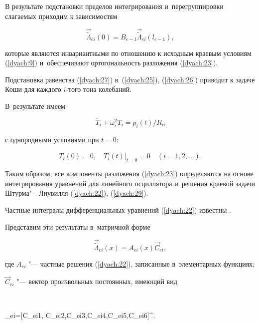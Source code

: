 В результате подстановки пределов интегрирования и~перегруппировки слагаемых приходим к зависимостям

\begin{equation}

\label{dyach:29}

\vec{\widetilde{\Lambda}}_{ei}(0)=B_{e-1}\vec{\widetilde{\Lambda}}_{ei}(l_{e-1}),

\end{equation}

которые являются инвариантными по отношению к исходным краевым условиям (\ref{dyach:9}) и~обеспечивают ортогональность разложения (\ref{dyach:23}).

Подстановка равенства (\ref{dyach:27}) в~(\ref{dyach:25}), (\ref{dyach:26}) приводит к задаче Коши для каждого $i$-того тона колебаний. 

В~результате имеем

$$

\ddot{T}_{i}+\omega_{i}^{2}T_{i}=p_{i}(t)/R_{ii}

$$

с однородными условиями при $t=0$:

$$T_{i}(0)=0, \quad \dot{T}_{i}(t)|_{t=0}=0 \quad(i=1, 2, \ldots).$$



Таким образом, все компоненты разложения (\ref{dyach:23}) определяются на основе интегрирования уравнений для линейного осциллятора и~решения краевой задачи Штурма"--~Лиувилля (\ref{dyach:22}), (\ref{dyach:29}).



Частные интегралы дифференциальных уравнений (\ref{dyach:22}) известны \cite{dyach:bib:Grid}.

Представим эти результаты в~матричной форме

\begin{equation}

\label{dyach:30}

\vec{\widetilde{\Lambda}}_{ei}(x)=A_{ei}(x)\vec{C}_{ei},

\end{equation}

где $A_{ei}$ "--- частные решения (\ref{dyach:22}), записанные в~элементарных функциях; 

$\vec{C}_{ei}$ "--- вектор произвольных постоянных, имеющий вид

$$

_{ei}=[C_{ei1}, C_{ei2},C_{ei3},C_{ei4},C_{ei5},C_{ei6}]^{\top}.

